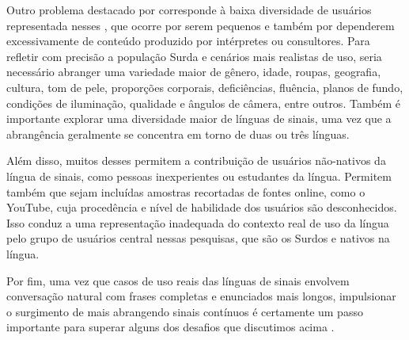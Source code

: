 Outro problema destacado por  corresponde à baixa diversidade de usuários representada nesses \datasets, que ocorre por serem pequenos e também por dependerem excessivamente de conteúdo produzido por intérpretes ou consultores. Para refletir com precisão a população Surda e cenários mais realistas de uso, seria necessário abranger uma variedade maior de gênero, idade, roupas, geografia, cultura, tom de pele, proporções corporais, deficiências, fluência, planos de fundo, condições de iluminação, qualidade e ângulos de câmera, entre outros. Também é importante explorar uma diversidade maior de línguas de sinais, uma vez que a abrangência geralmente se concentra em torno de duas ou três línguas.

Além disso, muitos desses \datasets permitem a contribuição de usuários não-nativos da língua de sinais, como pessoas inexperientes ou estudantes da língua. Permitem também que sejam incluídas amostras recortadas de fontes online, como o YouTube, cuja procedência e nível de habilidade dos usuários são desconhecidos. 
Isso conduz a uma representação inadequada do contexto real de uso da língua pelo grupo de usuários central nessas pesquisas, que são os Surdos e nativos na língua.

Por fim, uma vez que casos de uso reais das línguas de sinais envolvem conversação natural com frases completas e enunciados mais longos, impulsionar o surgimento de mais \datasets abrangendo sinais contínuos é certamente um passo importante para superar alguns dos desafios que discutimos acima \cite{bragg-2019-slr-interdisciplinary}.











